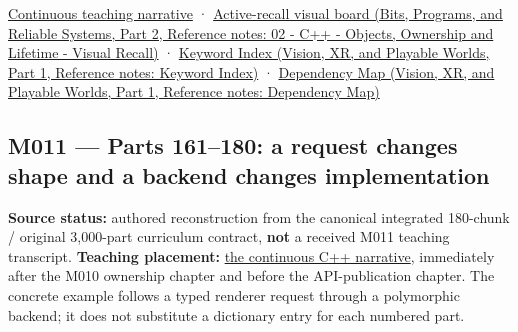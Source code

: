 \hyperref[01-foundations-i-ch004-from-a-live-object-to-responsible-resource-ownership]{Continuous teaching narrative} · \href{../01-Bits-Programs-and-Reliable-Systems-P02/main.pdf\#appendix-960160274237}{Active-recall visual board (Bits, Programs, and Reliable Systems, Part 2, Reference notes: 02 - C++ - Objects, Ownership and Lifetime - Visual Recall)} · \href{../07-Vision-XR-and-Playable-Worlds-P01/main.pdf\#appendix-a6d556a4ef50}{Keyword Index (Vision, XR, and Playable Worlds, Part 1, Reference notes: Keyword Index)} · \href{../07-Vision-XR-and-Playable-Worlds-P01/main.pdf\#appendix-4ad47bdd269a}{Dependency Map (Vision, XR, and Playable Worlds, Part 1, Reference notes: Dependency Map)}

\subsection{M011 --- Parts 161--180: a request changes shape and a backend changes implementation}\label{appendix-fd090d982a15-m011-parts-161180-a-request-changes-shape-and-a-backend-changes-implementation}

\hypertarget{appendix-fd090d982a15-m011-parts-161180-a-request-changes-shape-and-a-backend-changes-implementation}{}

\textbf{Source status:} authored reconstruction from the canonical integrated 180-chunk / original 3,000-part curriculum contract, \textbf{not} a received M011 teaching transcript. \textbf{Teaching placement:} \hyperref[01-foundations-i-ch004-from-one-owned-resource-to-many-requests-and-a-replaceable-backend]{the continuous C++ narrative}, immediately after the M010 ownership chapter and before the API-publication chapter. The concrete example follows a typed renderer request through a polymorphic backend; it does not substitute a dictionary entry for each numbered part.

